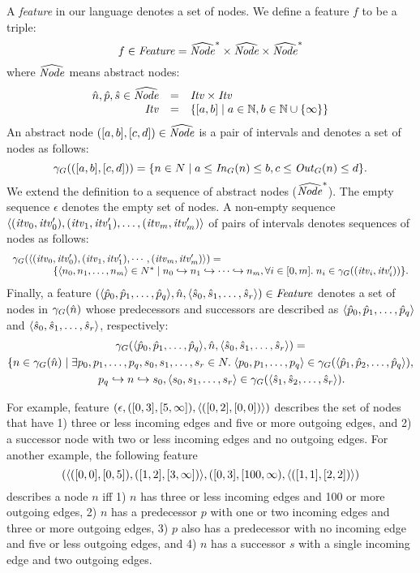 A {\em feature} in our language denotes a set of nodes. We define a feature $f$ to be a triple:
\[
f \in {\it Feature} = \widehat{\it Node}^* \times \widehat{\it Node} \times \widehat{\it Node}^*
\]
where $\widehat{\it Node}$ means abstract nodes:
\[
\begin{array}{rcl}
{\hat{n}}, {\hat{p}}, {\hat{s}} \in \widehat{\it Node} &=& {\it Itv} \times {\it Itv} \\
{\it Itv} &=& \{ [a,b] \mid a \in \mathbb{N}, b \in \mathbb{N} \cup \{ \infty \} \}
\end{array}
\]
An abstract node $([a,b], [c,d]) \in \widehat{\it Node}$ is a pair of intervals and denotes a set of nodes as follows:
\[
\gamma_G(([a,b], [c,d])) = \{ n \in N \mid a \le {\it In}_G(n) \le b, c \le {\it Out}_G(n) \le d \}.
\]
We extend the definition to a sequence of abstract nodes ($\widehat{\it Node}^*$).
The empty sequence $\epsilon$ denotes the empty set of nodes.
A non-empty sequence $\langle ({\it itv}_0, {\it itv}'_0), ({\it itv}_1, {\it itv}'_1), \dots, ({\it itv}_m, {\it itv}'_m) \rangle$
of pairs of intervals denotes sequences of nodes as follows:
\[
\begin{array}{l}
\gamma_G(\langle ({\it itv}_0, {\it itv}'_0),({\it itv}_1, {\it itv}'_1),\cdots, ({\it itv}_m, {\it itv}'_m) \rangle) = \\
\qquad\qquad \{ \langle n_0,n_1,\dots,n_m \rangle \in N^* \mid n_0 \hookrightarrow n_1 \hookrightarrow \cdots \hookrightarrow n_m, \forall i \in [0,m].\; n_i \in \gamma_G(({\it itv}_i, {\it itv}'_i)) \}.
\end{array}
\]
Finally, a feature  $(\langle {\hat{p}}_0,{\hat{p}}_1,\dots,{\hat{p}}_q \rangle, {\hat{n}}, \langle {\hat{s}}_0,{\hat{s}}_1,\dots,{\hat{s}}_r \rangle) \in {\it Feature}$
 denotes a set of nodes in $\gamma_G({\hat{n}})$ whose predecessors and successors are described as
$\langle {\hat{p}}_0,{\hat{p}}_1,\dots,{\hat{p}}_q \rangle$ and $\langle {\hat{s}}_0,{\hat{s}}_1,\dots,{\hat{s}}_r \rangle$, respectively:
\begin{multline*}
	\gamma_G(\langle {\hat{p}}_0,{\hat{p}}_1,\dots,{\hat{p}}_q \rangle, {\hat{n}}, \langle {\hat{s}}_0,{\hat{s}}_1,\dots,{\hat{s}}_r \rangle) = \\   \{ n \in \gamma_G({\hat{n}}) \mid \exists p_0,p_1,\dots,p_q, s_0,s_1,\dots,s_r \in N.\; \langle p_0,p_1,\dots,p_q \rangle \in \gamma_G(\langle {\hat{p}}_1,{\hat{p}}_2,\dots,{\hat{p}}_q \rangle),\\
	\qquad
	 p_q \hookrightarrow n \hookrightarrow s_0,
	\langle s_0,s_1,\dots,s_r \rangle \in \gamma_G(\langle {\hat{s}}_1,{\hat{s}}_2,\dots,{\hat{s}}_r \rangle).	
\end{multline*}



For example, feature $(\epsilon,([0,3],[5,\infty]), \langle ([0,2],[0,0]) \rangle )$ describes the set of nodes that have 1) three or less incoming edges and five or more outgoing edges, and 2) a successor node with two or less incoming edges and no outgoing edges.
For another example, the following feature
\[
(\langle ([0,0],[0,5]), ([1,2], [3,\infty]) \rangle, ([0,3], [100,\infty), \langle ([1,1], [2,2]) \rangle)
\]
describes a node $n$ iff 1) $n$ has three or less incoming edges and 100 or more outgoing edges, 2) $n$ has a predecessor $p$  with one or two incoming edges and three or more outgoing edges,  3) $p$ also has a predecessor with no incoming edge and five or less outgoing edges, and 4) $n$ has a successor $s$ with a single incoming edge and two outgoing edges.


